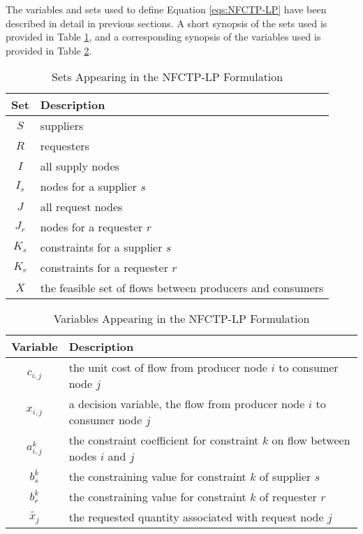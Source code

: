 The variables and sets used to define Equation \ref{eqs:NFCTP-LP} have been
described in detail in previous sections. A short synopsis of the sets used is
provided in Table \ref{tbl:NFCTP-LP-sets}, and a corresponding synopsis of the
variables used is provided in Table \ref{tbl:NFCTP-LP-vars}.

\begin{table} [h!]
\centering
\begin{tabularx}{\columnwidth-10pt}{|c|X|} %
\hline
Set         & Description \\
\hline
$S$     & suppliers \\
$R$     & requesters \\
$I$     & all supply nodes \\
$I_s$   & nodes for a supplier $s$ \\
$J$     & all request nodes \\
$J_r$   & nodes for a requester $r$ \\
$K_s$   & constraints for a supplier $s$ \\
$K_r$   & constraints for a requester $r$ \\
$X$         & the feasible set of flows between producers and consumers  \\
\hline
\end{tabularx}
\caption{Sets Appearing in the NFCTP-LP Formulation}
\label{tbl:NFCTP-LP-sets}
\end{table}

\begin{table} [h!]
\centering
\begin{tabularx}{\columnwidth-10pt}{|c|X|} %
\hline
Variable    & Description \\
\hline
$c_{i,j}$             & the unit cost of flow
                          from producer node $i$ to consumer node $j$  \\
$x_{i,j}$             & a decision variable, the flow 
                          from producer node $i$ to consumer node $j$  \\
$a_{i,j}^k$ & the constraint coefficient for constraint $k$ 
                          on flow between nodes $i$ and $j$  \\
$b_s^k$   & the constraining value for constraint $k$ of supplier $s$ \\
$b_r^k$   & the constraining value for constraint $k$ of requester $r$ \\
$\tilde{x_j}$ & the requested quantity associated with request node $j$ \\
\hline
\end{tabularx}
\caption{Variables Appearing in the NFCTP-LP Formulation}
\label{tbl:NFCTP-LP-vars}
\end{table}

